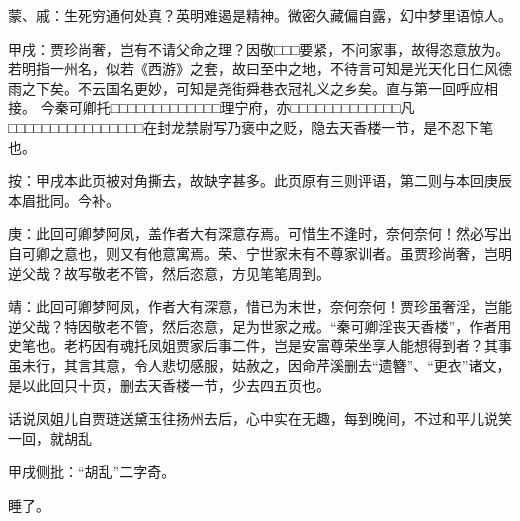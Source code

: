 
\begin{parag}
    \begin{note}蒙、戚：生死穷通何处真？英明难遏是精神。微密久藏偏自露，幻中梦里语惊人。\end{note}
\end{parag}


\begin{parag}
    \begin{note}甲戌：贾珍尚奢，岂有不请父命之理？因敬□□□要紧，不问家事，故得恣意放为。
        若明指一州名，似若《西游》之套，故曰至中之地，不待言可知是光天化日仁风德雨之下矣。不云国名更妙，可知是尧街舜巷衣冠礼义之乡矣。直与第一回呼应相接。
        今秦可卿托□□□□□□□□□□□□□理宁府，亦□□□□□□□□□□□□□凡□□□□□□□□□□□□□□□□在封龙禁尉写乃褒中之贬，隐去天香楼一节，是不忍下笔也。\end{note}\begin{subnote}按：甲戌本此页被对角撕去，故缺字甚多。此页原有三则评语，第二则与本回庚辰本眉批同。今补。\end{subnote}
\end{parag}


\begin{parag}
    \begin{note}庚：此回可卿梦阿凤，盖作者大有深意存焉。可惜生不逢时，奈何奈何！然必写出自可卿之意也，则又有他意寓焉。荣、宁世家未有不尊家训者。虽贾珍尚奢，岂明逆父哉？故写敬老不管，然后恣意，方见笔笔周到。\end{note}
\end{parag}


\begin{parag}
    \begin{note}靖：此回可卿梦阿凤，作者大有深意，惜已为末世，奈何奈何！贾珍虽奢淫，岂能逆父哉？特因敬老不管，然后恣意，足为世家之戒。“秦可卿淫丧天香楼”，作者用史笔也。老朽因有魂托凤姐贾家后事二件，岂是安富尊荣坐享人能想得到者？其事虽未行，其言其意，令人悲切感服，姑赦之，因命芹溪删去“遗簪”、“更衣”诸文，是以此回只十页，删去天香楼一节，少去四五页也。\end{note}
\end{parag}


\begin{parag}
    话说凤姐儿自贾琏送黛玉往扬州去后，心中实在无趣，每到晚间，不过和平儿说笑一回，就胡乱\begin{note}甲戌侧批：“胡乱”二字奇。\end{note}睡了。
\end{parag}



